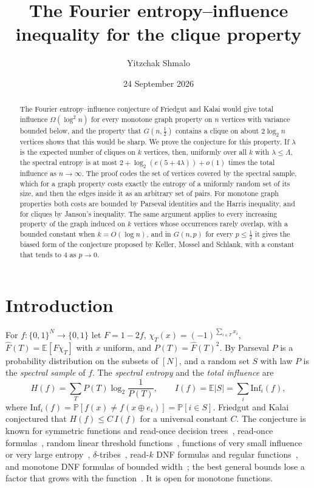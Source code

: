 \documentclass[11pt]{amsart}
\title[Entropy--influence for the clique property]{The Fourier entropy--influence inequality for the clique property}
\author{Yitzchak Shmalo}
\date{24 September 2026}
\theoremstyle{remark}
\newcommand{\E}{\mathbb{E}}
\renewcommand{\Pr}{\mathbb{P}}
\newcommand{\Inf}{\mathrm{Inf}}
\newcommand{\bits}{\{0,1\}}
\begin{document}
\begin{abstract}
The Fourier entropy--influence conjecture of Friedgut and Kalai would give total influence $\Omega(\log^2n)$ for every
monotone graph property on $n$ vertices with variance bounded below, and the property that $G(n,\frac12)$ contains a
clique on about $2\log_2n$ vertices shows that this would be sharp. We prove the conjecture for this property. If
$\lambda$ is the expected number of cliques on $k$ vertices, then, uniformly over all $k$ with $\lambda\le\Lambda$, the
spectral entropy is at most $2+\log_2(e(5+4\lambda))+o(1)$ times the total influence as $n\to\infty$. The proof codes
the set of vertices covered by the spectral sample, which for a graph property costs exactly the entropy of a uniformly
random set of its size, and then the edges inside it as an arbitrary set of pairs. For monotone graph properties both
costs are bounded by Parseval identities and the Harris inequality, and for cliques by Janson's inequality. The same argument applies to every increasing property of the graph
induced on $k$ vertices whose occurrences rarely overlap, with a bounded constant when $k=O(\log n)$, and in
$G(n,p)$ for every $p\le\frac12$ it gives the biased form of the conjecture proposed by Keller, Mossel and
Schlank, with a constant that tends to $4$ as $p\to0$.
\end{abstract}

\maketitle

\section{Introduction}

For $f\colon\bits^N\to\bits$ let $F=1-2f$, $\chi_T(x)=(-1)^{\sum_{i\in T}x_i}$, $\widehat F(T)=\E[F\chi_T]$ with $x$
uniform, and $P(T)=\widehat F(T)^2$. By Parseval $P$ is a probability distribution on the subsets of $[N]$, and a
random set $S$ with law $P$ is the \emph{spectral sample} of $f$. The \emph{spectral entropy} and the \emph{total
influence} are
\[
H(f)=\sum_TP(T)\log_2\frac1{P(T)},\qquad I(f)=\E|S|=\sum_i\Inf_i(f),
\]
where $\Inf_i(f)=\Pr[f(x)\ne f(x\oplus e_i)]=\Pr[i\in S]$. Friedgut and Kalai~\cite{FK96} conjectured that
$H(f)\le C\,I(f)$ for a universal constant $C$. The conjecture is known for symmetric functions and read-once decision
trees~\cite{OWZ11}, read-once formulas~\cite{OT13}, random linear threshold functions~\cite{CKKLS18}, functions of
very small influence or very large entropy~\cite{Sha19}, $\delta$-tribes~\cite{GMP26}, read-$k$ DNF formulas and
regular functions~\cite{Shm26a}, and monotone DNF formulas of bounded width~\cite{Shm26b}; the best general bounds
lose a factor that grows with the function~\cite{KKLMS20,KMS12,Han25}. It is open for monotone functions.
\end{document}
